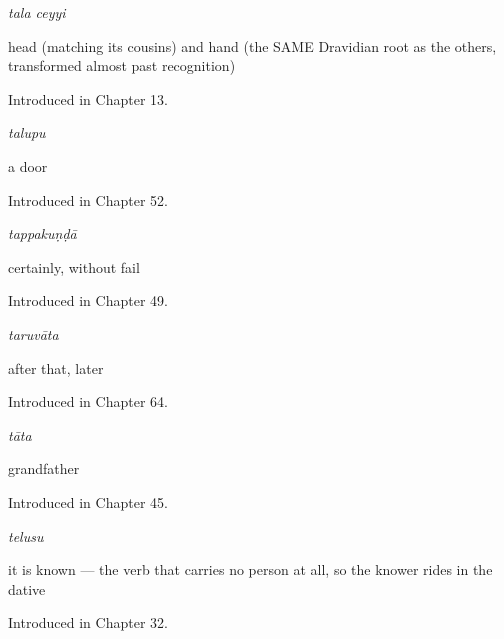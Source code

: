 \noindent\begin{minipage}[t]{\linewidth}
\raggedright
\textbf{ }\enspace\emph{tala ceyyi}\par
\small head (matching its cousins) and hand (the SAME Dravidian root as the others, transformed almost past recognition)\par
\footnotesize Introduced in Chapter 13.
\end{minipage}\par\medskip

\noindent\begin{minipage}[t]{\linewidth}
\raggedright
\textbf{}\enspace\emph{talupu}\par
\small a door\par
\footnotesize Introduced in Chapter 52.
\end{minipage}\par\medskip

\noindent\begin{minipage}[t]{\linewidth}
\raggedright
\textbf{}\enspace\emph{tappakuṇḍā}\par
\small certainly, without fail\par
\footnotesize Introduced in Chapter 49.
\end{minipage}\par\medskip

\noindent\begin{minipage}[t]{\linewidth}
\raggedright
\textbf{}\enspace\emph{taruvāta}\par
\small after that, later\par
\footnotesize Introduced in Chapter 64.
\end{minipage}\par\medskip

\noindent\begin{minipage}[t]{\linewidth}
\raggedright
\textbf{}\enspace\emph{tāta}\par
\small grandfather\par
\footnotesize Introduced in Chapter 45.
\end{minipage}\par\medskip

\noindent\begin{minipage}[t]{\linewidth}
\raggedright
\textbf{}\enspace\emph{telusu}\par
\small it is known — the verb that carries no person at all, so the knower rides in the dative\par
\footnotesize Introduced in Chapter 32.
\end{minipage}\par\medskip

